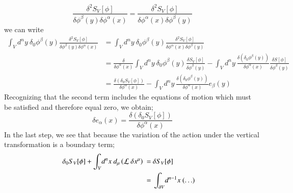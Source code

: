 \documentclass{article}
\begin{document}
\[
	\frac{\delta^2 S_V[\phi]}{\delta \phi^{\beta}(y)\delta \phi^{\alpha}(x)} = \frac{\delta^2 S_V[\phi]}{\delta \phi^{\alpha}(x)\delta \phi^{\beta}(y)}
\]
we can write
\begin{align*}
	\int_V\! d^ny~ \delta_0\phi^{\beta}(y)\frac{\delta^2 S_V[\phi]}{\delta \phi^{\beta}(y)\delta \phi^{\alpha}(x)} &= \int_V\! d^ny~ \delta_0\phi^{\beta}(y)\frac{\delta^2 S_V[\phi]}{\delta \phi^{\alpha}(x)\delta \phi^{\beta}(y)} \\
														        &= \frac{\delta}{\delta \phi^{\alpha}(x)} \int_V\! d^ny~ \delta_0\phi^{\beta}(y)\frac{\delta S_V[\phi]}{\delta \phi^{\beta}(y)} -\int_V\! d^ny~ \frac{\delta(\delta_0\phi^{\beta}(y))}{\delta \phi^{\alpha}(x)} \frac{\delta S[\phi]}{\delta \phi^{\beta}(y)} \\
	&= \frac{\delta(\delta_0 S_V[\phi]) }{\delta \phi^{\alpha}(x)} -\int_V\! d^ny~ \frac{\delta(\delta_0\phi^{\beta}(y))}{\delta \phi^{\alpha}(x)} e_{\beta}(y)
\end{align*}
Recognizing that the second term includes the equations of motion which must be satisfied and therefore equal zero, we obtain;
\[
	\delta e_\alpha(x) = \frac{\delta(\delta_0 S_V[\phi]) }{\delta \phi^{\alpha}(x)}
\]
In the last step, we see that because the variation of the action under the vertical transformation is a boundary term;
\begin{align*}  \delta_0 S_V[\phi]+\int_V\! d^nx~d_{\mu} \left({\cal L}~\delta x^{\mu} \right)  ~=~&\delta S_V[\phi]\cr
~=~&\int_{\partial V} \!d^{n-1}x~(\ldots)\end{align*}
\end{document}
